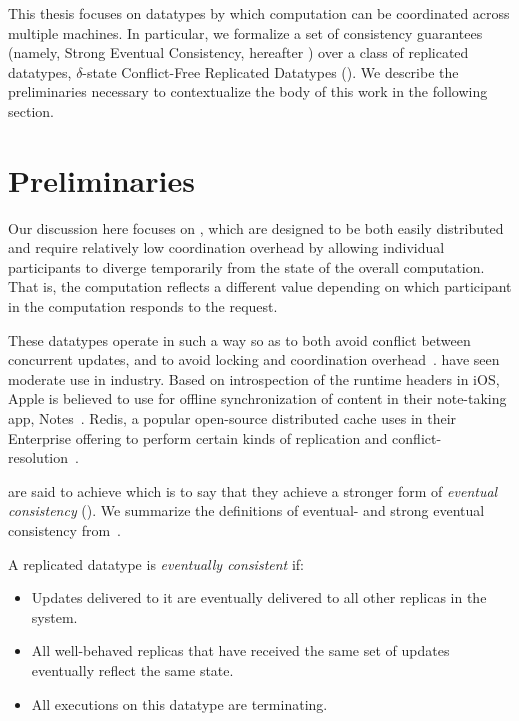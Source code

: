 This thesis focuses on datatypes by which computation can be coordinated across
multiple machines. In particular, we formalize a set of consistency guarantees
(namely, Strong Eventual Consistency, hereafter \SEC) over a class of replicated
datatypes, $\delta$-state Conflict-Free Replicated Datatypes (\CRDTs). We
describe the preliminaries necessary to contextualize the body of this work in
the following section.

\section{Preliminaries}
Our discussion here focuses on \CRDTs, which are designed to be
both easily distributed and require relatively low coordination overhead by
allowing individual participants to diverge temporarily from the state of the
overall computation. That is, the computation reflects a different value
depending on which participant in the computation responds to the request.

These datatypes operate in such a way so as to both avoid conflict between
concurrent updates, and to avoid locking and coordination
overhead~\citep{shapiro11}. \CRDTs have seen moderate use in industry.
Based on introspection of the runtime headers in iOS, Apple is believed to use
\CRDTs for offline synchronization of content in their note-taking
app, Notes~\citep{applenotes}.  Redis, a popular open-source distributed cache
uses \CRDTs in their Enterprise offering to perform certain kinds of replication
and conflict-resolution~\citep{redis}.

\CRDTs are said to achieve \SEC which is to say that they achieve a stronger
form of \textit{eventual consistency} (\EC). We summarize the definitions of
eventual- and strong eventual consistency from~\cite{shapiro11}.

\begin{definition}
  \label{def:eventual-consistency}
  A replicated datatype is \emph{eventually consistent} if:
  \begin{itemize}
    \item Updates delivered to it are eventually delivered to all other replicas
      in the system.
    \item All well-behaved replicas that have received the same set of updates
      eventually reflect the same state.
    \item All executions on this datatype are terminating.
  \end{itemize}
\end{definition}

